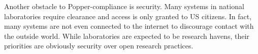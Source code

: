 Another obstacle to Popper-compliance is security. Many systems in national
laboratories require clearance and access is only granted to US citizens. In
fact, many systems are not even connected to the internet to discourage contact
with the outside world. While laboratories are expected to be research havens,
their priorities are obviously security over open research practices.

